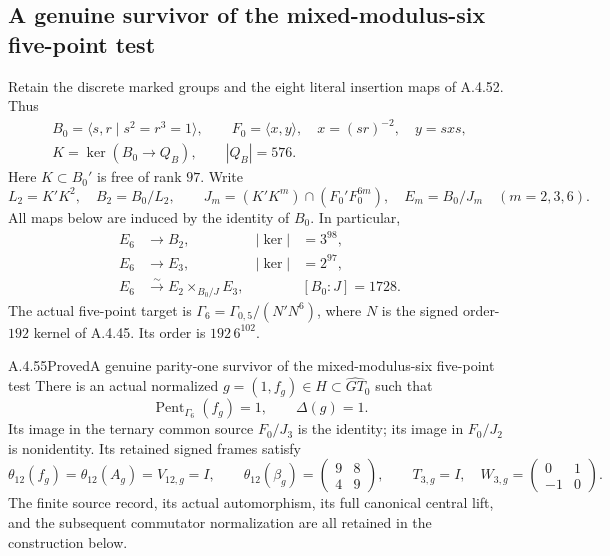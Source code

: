 \subsection{A genuine survivor of the mixed-modulus-six five-point test}

Retain the discrete marked groups and the eight literal insertion maps
of A.4.52.  Thus
\[
 \begin{gathered}
 B_0=\langle s,r\mid s^2=r^3=1\rangle,\qquad
 F_0=\langle x,y\rangle,\quad x=(sr)^{-2},\quad y=sxs,\\
 K=\ker(B_0\longrightarrow Q_B),\qquad |Q_B|=576.
 \end{gathered}
 \tag{CMC.1}
\]
Here $K\subset B_0'$ is free of rank $97$.  Write
\[
 L_2=K'K^2,\quad B_2=B_0/L_2,\qquad
 J_m=(K'K^m)\cap(F_0'F_0^{6m}),\quad E_m=B_0/J_m
 \quad(m=2,3,6).
 \tag{CMC.2}
\]
All maps below are induced by the identity of $B_0$.  In particular,
\[
 \begin{aligned}
 E_6&\longrightarrow B_2,& |\ker|&=3^{98},\\
 E_6&\longrightarrow E_3,& |\ker|&=2^{97},\\
 E_6&\xrightarrow{\sim} E_2\mathop{\times}_{B_0/J}E_3,
 &&[B_0:J]=1728.
 \end{aligned}
 \tag{CMC.3}
\]
The actual five-point target is
$\Gamma_6=\Gamma_{0,5}/(N'N^6)$, where $N$ is the signed
order-$192$ kernel of A.4.45.  Its order is $192\,6^{102}$.

\begin{result}{A.4.55}{Proved}{A genuine parity-one survivor of the mixed-modulus-six five-point test}
There is an actual normalized $g=(1,f_g)\in H\subset\widehat{GT}_0$
such that
\[
 \operatorname{Pent}_{\Gamma_6}(f_g)=1,\qquad
 \Delta(g)=1.
 \tag{CMC.4}
\]
Its image in the ternary common source $F_0/J_3$ is the identity;
its image in $F_0/J_2$ is nonidentity.  Its retained signed frames satisfy
\[
 \theta_{12}(f_g)=\theta_{12}(A_g)=V_{12,g}=I,
 \qquad
 \theta_{12}(\beta_g)=
 \begin{pmatrix}9&8\\4&9\end{pmatrix},
 \qquad T_{3,g}=I,\quad
 W_{3,g}=\begin{pmatrix}0&1\\-1&0\end{pmatrix}.
 \tag{CMC.5}
\]
The finite source record, its actual automorphism, its full canonical
central lift, and the subsequent commutator normalization are all retained
in the construction below.
\end{result}


